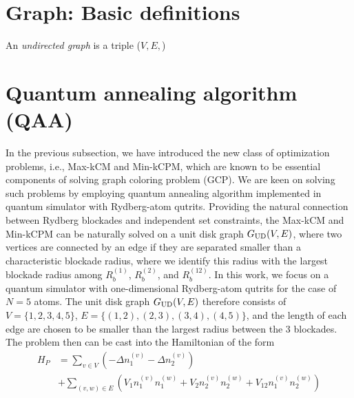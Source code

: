 \documentclass[%
 reprint,
nofootinbib,
 amsmath,amssymb,
 aps,
pra,
floatfix,
]{revtex4-2}
\begin{document}



\clearpage


\onecolumngrid
\appendix

\section{Graph: Basic definitions }\label{appendix:graph-definition}

An \emph{undirected graph} is a triple ($V,E,$)

\section{Quantum annealing algorithm (QAA)}

In the previous subsection, we have introduced the new class of optimization problems, i.e., Max-kCM and Min-kCPM, which are known to be essential components of solving graph coloring problem (GCP). We are keen on solving such problems by employing quantum annealing algorithm implemented in quantum simulator with Rydberg-atom qutrits. Providing the natural connection between Rydberg blockades and independent set constraints, the Max-kCM and Min-kCPM can be naturally solved on a unit disk graph $G_{\rm UD}(V,E)$, where two vertices are connected by an edge if they are separated smaller than a characteristic blockade radius, where we identify this radius with the largest blockade radius among $R^{(1)}_b$, $R^{(2)}_b$, and $R^{(12)}_b$. In this work, we focus on a quantum simulator with one-dimensional Rydberg-atom qutrits for the case of $N=5$ atoms. The unit disk graph $G_{\rm UD}(V,E)$ therefore consists of $V=\{1,2,3,4,5\}$, $E=\{(1,2),(2,3),(3,4),(4,5)\}$, and the length of each edge are chosen to be smaller than the largest radius between the 3 blockades. The problem then can be cast into the Hamiltonian of the form 
\begin{align}\label{eq:H_p}
H_{P}  &= \sum_{v \in V} (- \Delta n^{(v)}_1  - \Delta n^{(v)}_2) \nonumber \\ 
&+ \sum_{(v,w) \in E} (V_1 n^{(v)}_1 n^{(w)}_1  + V_2 n^{(v)}_2 n^{(w)}_2 + V_{12} n^{(v)}_1 n^{(w)}_2)
\end{align}
\end{document}
